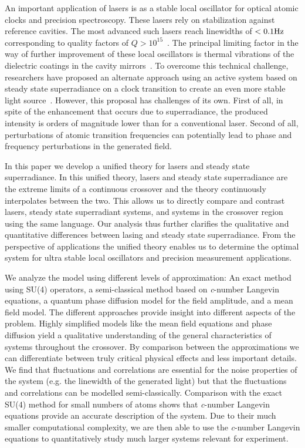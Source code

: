 \documentclass[aps,
twocolumn,
showpacs,
superscriptaddress,groupedaddress]{revtex4}
\begin{document}
An important application of lasers is as a stable local oscillator for
optical atomic clocks and precision spectroscopy.  These lasers rely on
stabilization against reference cavities.  The most advanced such lasers
reach linewidths of $< 0.1 {\rm Hz}$ corresponding to quality factors of
$Q>10^{15}$~\cite{Cole:TenfoldReductionBrownianNoise}. The principal
limiting factor in the way of further improvement of these local
oscillators is thermal vibrations of the dielectric coatings in the
cavity mirrors~\cite{PhysRevLett.101.260602}.  To overcome this
technical challenge, researchers have proposed an alternate approach
using an active system based on steady state superradiance on a clock
transition to create an even more stable light
source~\cite{PhysRevLett.102.163601, ChenDeliciousLaser}.  However, this
proposal has challenges of its own.  First of all, in spite of the
enhancement that occurs due to superradiance, the produced intensity is
orders of magnitude lower than for a conventional laser.  Second of all,
perturbations of atomic transition frequencies can potentially lead to
phase and frequency perturbations in the generated field.

In this paper we develop a unified theory for lasers and steady state
superradiance.  In this unified theory, lasers and steady state
superradiance are the extreme limits of a continuous crossover and the
theory continuously interpolates between the two.  This allows us to
directly compare and contrast lasers, steady state superradiant systems,
and systems in the crossover region using the same language.  Our
analysis thus further clarifies the qualitative and quantitative
differences between lasing and steady state superradiance.  From the
perspective of applications the unified theory enables us to determine
the optimal system for ultra stable local oscillators and precision
measurement applications.

We analyze the model using different levels of approximation: An exact
method using SU(4) operators, a semi-classical method based on {\it
c}-number Langevin equations, a quantum phase diffusion model for the
field amplitude, and a mean field model.  The different approaches provide insight into
different aspects of the problem.  Highly simplified models like the
mean field equations and phase diffusion yield a qualitative
understanding of the general characteristics of systems throughout the
crossover.  By comparison between the approximations we can
differentiate between truly critical physical effects and less important
details.  We find that fluctuations and correlations are essential for
the noise properties of the system (e.g. the linewidth of the generated
light) but that the fluctuations and correlations can be modelled
semi-classically.  Comparison with the exact SU(4) method for small
numbers of atoms shows that {\it c}-number Langevin equations provide an
accurate description of the system.  Due to their much smaller
computational complexity, we are then able to use the {\it c}-number
Langevin equations to quantitatively study much larger systems relevant
for experiment.
\end{document}
